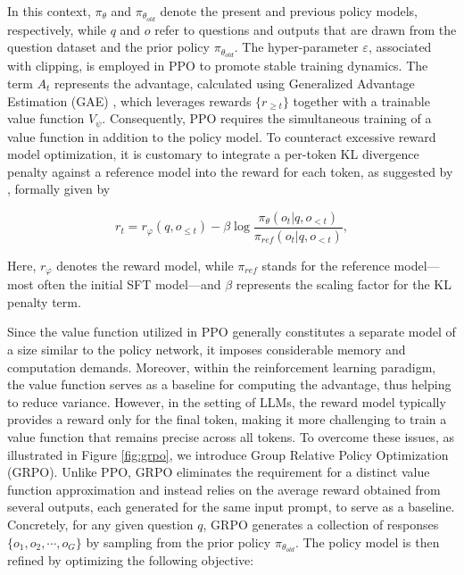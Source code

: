 \begin{itemize}[topsep=0pt]
\begin{itemize}[topsep=0pt]
In this context, $\pi_{\theta}$ and $\pi_{\theta_{old}}$ denote the present and previous policy models, respectively, while $q$ and $o$ refer to questions and outputs that are drawn from the question dataset and the prior policy $\pi_{\theta_{old}}$. The hyper-parameter $\varepsilon$, associated with clipping, is employed in PPO to promote stable training dynamics. The term $A_t$ represents the advantage, calculated using Generalized Advantage Estimation (GAE) \citep{gae}, which leverages rewards $\{r_{\ge t}\}$ together with a trainable value function $V_{\psi}$. Consequently, PPO requires the simultaneous training of a value function in addition to the policy model. To counteract excessive reward model optimization, it is customary to integrate a per-token KL divergence penalty against a reference model into the reward for each token, as suggested by \citet{ouyang2022training}, formally given by

\begin{equation}
    r_{t} = r_\varphi(q, o_{\le t}) - \beta \log\frac{\pi_{\theta}(o_{t}|q, o_{<t})}{\pi_{ref}(o_{t}|q, o_{<t})},
\label{eq:PPO-reward}
\end{equation}

Here, $r_\varphi$ denotes the reward model, while $\pi_{ref}$ stands for the reference model—most often the initial SFT model—and $\beta$ represents the scaling factor for the KL penalty term.

Since the value function utilized in PPO generally constitutes a separate model of a size similar to the policy network, it imposes considerable memory and computation demands. Moreover, within the reinforcement learning paradigm, the value function serves as a baseline for computing the advantage, thus helping to reduce variance. However, in the setting of LLMs, the reward model typically provides a reward only for the final token, making it more challenging to train a value function that remains precise across all tokens. To overcome these issues, as illustrated in Figure \ref{fig:grpo}, we introduce Group Relative Policy Optimization (GRPO). Unlike PPO, GRPO eliminates the requirement for a distinct value function approximation and instead relies on the average reward obtained from several outputs, each generated for the same input prompt, to serve as a baseline. Concretely, for any given question $q$, GRPO generates a collection of responses $\{o_1, o_2, \cdots, o_G\}$ by sampling from the prior policy $\pi_{\theta_{old}}$. The policy model is then refined by optimizing the following objective:


\end{itemize}
\end{itemize}
